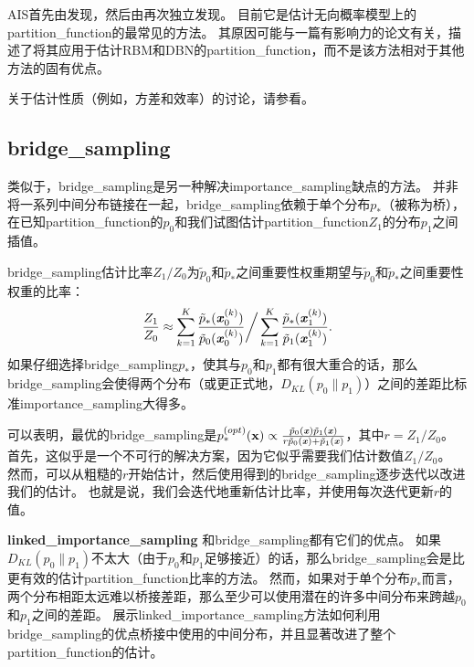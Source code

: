 
\gls{AIS}首先由\cite{Jarzynski1997}发现，然后由\cite{Neal-2001}再次独立发现。
目前它是估计无向概率模型上的\gls{partition_function}的最常见的方法。
其原因可能与一篇有影响力的论文\citep{Salakhutdinov+Murray-2008}有关，描述了将其应用于估计\gls{RBM}和\gls{DBN}的\gls{partition_function}，而不是该方法相对于其他方法的固有优点。


关于估计性质（例如，方差和效率）的讨论，请参看\cite{Neal-2001}。


\subsection{\gls{bridge_sampling}}
\label{subsec:bridge_sampling}
类似于，\gls{bridge_sampling}\citep{Bennet76}是另一种解决\gls{importance_sampling}缺点的方法。
并非将一系列中间分布链接在一起，\gls{bridge_sampling}依赖于单个分布$p_*$（被称为桥），在已知\gls{partition_function}的$p_0$和我们试图估计\gls{partition_function}$Z_1$的分布$p_1$之间插值。


\gls{bridge_sampling}估计比率$Z_1 / Z_0$为$\tilde{p}_0$和$\tilde{p}_*$之间重要性权重期望与$\tilde{p}_0$和$\tilde{p}_*$之间重要性权重的比率：
\begin{equation}
	\frac{Z_1}{ Z_0} \approx \sum_{k=1}^K \frac{ \tilde{p}_*(\boldsymbol{\mathit{x}}_0^{(k)}) }{ \tilde{p}_0(\boldsymbol{\mathit{x}}_0^{(k)}) } \bigg/ \sum_{k=1}^K \frac{ \tilde{p}_*(\boldsymbol{\mathit{x}}_1^{(k)}) }{ \tilde{p}_1(\boldsymbol{\mathit{x}}_1^{(k)}) } .
\end{equation}
如果仔细选择\gls{bridge_sampling}$p_*$，使其与$p_0$和$p_1$都有很大重合的话，那么\gls{bridge_sampling}会使得两个分布（或更正式地，$D_{KL}(p_0 \| p_1)$）之间的差距比标准\gls{importance_sampling}大得多。


可以表明，最优的\gls{bridge_sampling}是$p_*^{(opt)} (\mathbf{x}) \propto \frac{ \tilde{p}_0(\boldsymbol{\mathit{x}}) \tilde{p}_1(\boldsymbol{\mathit{x}}) }{ r\tilde{p}_0(\boldsymbol{\mathit{x}}) + \tilde{p}_1(\boldsymbol{\mathit{x}}) }$，其中$r = Z_1 / Z_0$。
首先，这似乎是一个不可行的解决方案，因为它似乎需要我们估计数值$Z_1 / Z_0$。
然而，可以从粗糙的$r$开始估计，然后使用得到的\gls{bridge_sampling}逐步迭代以改进我们的估计\citep{Neal05estimatingratios}。
也就是说，我们会迭代地重新估计比率，并使用每次迭代更新$r$的值。


\textbf{\gls{linked_importance_sampling}}
和\gls{bridge_sampling}都有它们的优点。
如果$D_{KL}(p_0 \| p_1)$不太大（由于$p_0$和$p_1$足够接近）的话，那么\gls{bridge_sampling}会是比更有效的估计\gls{partition_function}比率的方法。
然而，如果对于单个分布$p_*$而言，两个分布相距太远难以桥接差距，那么至少可以使用潜在的许多中间分布来跨越$p_0$和$p_1$之间的差距。
\cite{Neal05estimatingratios}展示\gls{linked_importance_sampling}方法如何利用\gls{bridge_sampling}的优点桥接中使用的中间分布，并且显著改进了整个\gls{partition_function}的估计。


